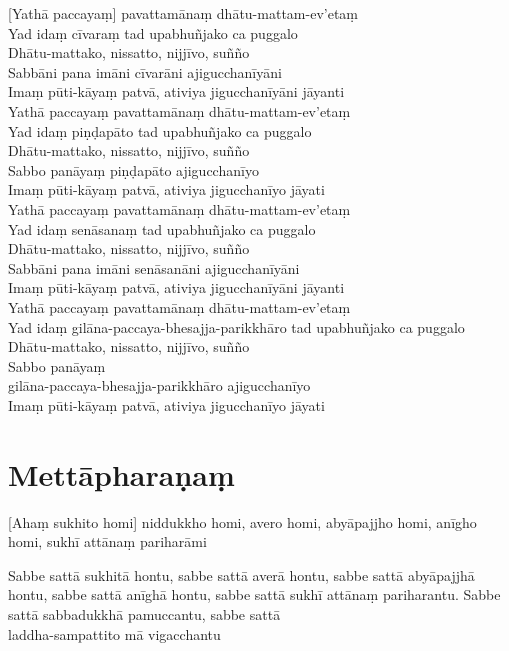 [Yathā paccayaṃ] pavattamānaṃ dhātu-mattam-ev'etaṃ\\
Yad idaṃ cīvaraṃ tad upabhuñjako ca puggalo\\
Dhātu-mattako, nissatto, nijjīvo, suñño\\
Sabbāni pana imāni cīvarāni ajigucchanīyāni\\
Imaṃ pūti-kāyaṃ patvā, ativiya jigucchanīyāni jāyanti\\
Yathā paccayaṃ pavattamānaṃ dhātu-mattam-ev'etaṃ\\
Yad idaṃ piṇḍapāto tad upabhuñjako ca puggalo\\
Dhātu-mattako, nissatto, nijjīvo, suñño\\
Sabbo panāyaṃ piṇḍapāto ajigucchanīyo\\
Imaṃ pūti-kāyaṃ patvā, ativiya jigucchanīyo jāyati\\
Yathā paccayaṃ pavattamānaṃ dhātu-mattam-ev'etaṃ\\
Yad idaṃ senāsanaṃ tad upabhuñjako ca puggalo\\
Dhātu-mattako, nissatto, nijjīvo, suñño\\
Sabbāni pana imāni senāsanāni ajigucchanīyāni\\
Imaṃ pūti-kāyaṃ patvā, ativiya jigucchanīyāni jāyanti\\
Yathā paccayaṃ pavattamānaṃ dhātu-mattam-ev'etaṃ\\
Yad idaṃ gilāna-paccaya-bhesajja-parikkhāro tad upabhuñjako ca puggalo\\
Dhātu-mattako, nissatto, nijjīvo, suñño\\
Sabbo panāyaṃ\\
gilāna-paccaya-bhesajja-parikkhāro ajigucchanīyo\\
Imaṃ pūti-kāyaṃ patvā, ativiya jigucchanīyo jāyati

\section{Mettāpharaṇaṃ}

\begin{leader}
\end{leader}


[Ahaṃ sukhito homi] niddukkho homi, avero homi, abyāpajjho homi, anīgho homi,
sukhī attānaṃ pariharāmi

Sabbe sattā sukhitā hontu, sabbe sattā averā hontu, sabbe sattā abyāpajjhā
hontu, sabbe sattā anīghā hontu, sabbe sattā sukhī attānaṃ pariharantu. Sabbe
sattā sabbadukkhā pamuccantu, sabbe sattā\\
laddha-sampattito mā vigacchantu

